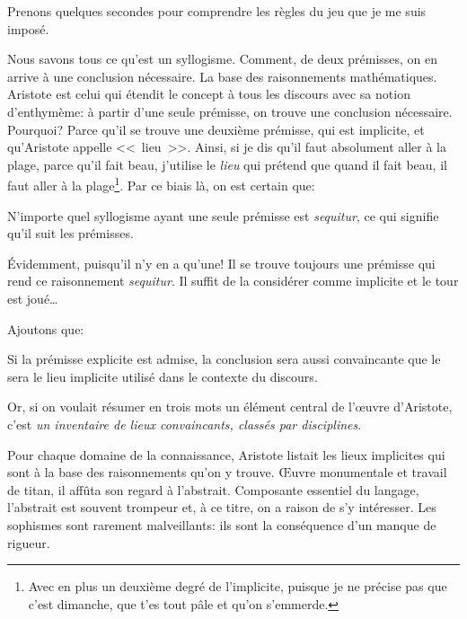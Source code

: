 Prenons quelques secondes pour comprendre les règles du jeu que je me suis imposé.

Nous savons tous ce qu'est un syllogisme. Comment, de deux prémisses, on en arrive à une conclusion nécessaire.
La base des raisonnements mathématiques. Aristote est celui qui étendit le concept à tous les discours avec sa
notion d'enthymème: à partir d'une seule prémisse, on trouve une conclusion nécessaire. Pourquoi? Parce qu'il
se trouve une deuxième prémisse, qui est implicite, et qu'Aristote appelle <<~lieu~>>. Ainsi, si je dis qu'il faut
absolument aller à la plage, parce qu'il fait beau, j'utilise le \emph{lieu} qui prétend que quand il fait beau,
il faut aller à la plage\footnote{Avec en plus un deuxième degré de l'implicite, puisque je ne précise pas que c'est
dimanche, que t'es tout pâle et qu'on s'emmerde.}. Par ce biais là, on est certain que:

\begin{emphpar}
	N'importe quel syllogisme ayant une seule prémisse est \emph{sequitur}, ce qui signifie qu'il suit les
	prémisses.
\end{emphpar}

Évidemment, puisqu'il n'y en a qu'une! Il se trouve toujours une prémisse qui rend ce raisonnement \emph{sequitur}.
Il suffit de la considérer comme implicite et le tour est joué\dots{}

Ajoutons que:

\begin{emphpar}
	Si la prémisse explicite est admise, la conclusion sera aussi convaincante que le sera le lieu implicite utilisé
	dans le contexte du discours.
\end{emphpar}

Or, si on voulait résumer en trois mots un élément central de l’œuvre d'Aristote, c'est \emph{un inventaire de lieux
convaincants, classés par disciplines}.

Pour chaque domaine de la connaissance, Aristote listait les lieux implicites qui sont à la base des raisonnements
qu'on y trouve. Œuvre monumentale et travail de titan, il affûta son regard à l'abstrait. Composante essentiel du
langage, l'abstrait est souvent trompeur et, à ce titre, on a raison de s'y intéresser. Les sophismes sont rarement
malveillants: ils sont la conséquence d'un manque de rigueur.

